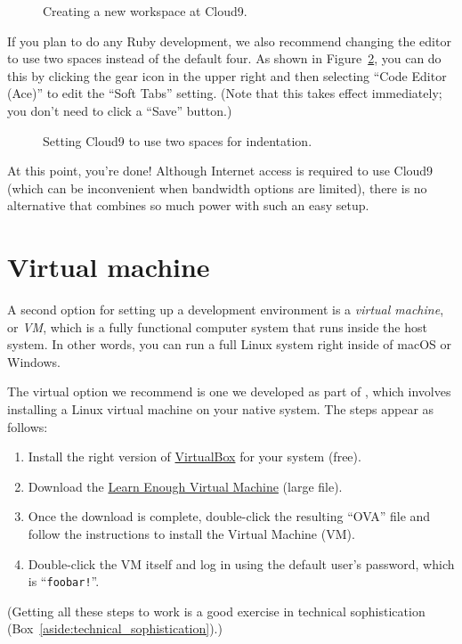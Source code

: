 \begin{figure}
\begin{center}
\end{center}
\caption{Creating a new workspace at Cloud9.\label{fig:cloud9_new_workspace}}
\end{figure}

If you plan to do any Ruby development, we also recommend changing the editor to use two spaces instead of the default four. As shown in Figure~\ref{fig:cloud9_two_spaces}, you can do this by clicking the gear icon in the upper right and then selecting ``Code Editor (Ace)'' to edit the ``Soft Tabs'' setting. (Note that this takes effect immediately; you don't need to click a ``Save'' button.)

\begin{figure}
\begin{center}
\end{center}
\caption{Setting Cloud9 to use two spaces for indentation.\label{fig:cloud9_two_spaces}}
\end{figure}

At this point, you're done! Although Internet access is required to use Cloud9 (which can be inconvenient when bandwidth options are limited), there is no alternative that combines so much power with such an easy setup.


\section{Virtual machine} %
\label{sec:virtual_machine}

A second option for setting up a development environment is a \emph{virtual machine}, or \emph{VM}, which is a fully functional computer system that runs inside the host system. In other words, you can run a full Linux system right inside of macOS or Windows.

The virtual option we recommend is one we developed as part of \lecl, which involves installing a Linux virtual machine on your native system. The steps appear as follows:

\begin{enumerate}
\item Install the right version of \href{https://www.virtualbox.org/}{VirtualBox} for your system (free).
\item Download the \href{https://softcover-static.s3.amazonaws.com/LearnEnough-v.1.4.ova}{Learn Enough Virtual Machine} (large file).
\item Once the download is complete, double-click the resulting ``OVA'' file and follow the instructions to install the Virtual Machine (VM).
\item Double-click the VM itself and log in using the default user's password, which is ``\texttt{foobar!}''.
\end{enumerate}
(Getting all these steps to work is a good exercise in technical sophistication (Box~\ref{aside:technical_sophistication}).)

